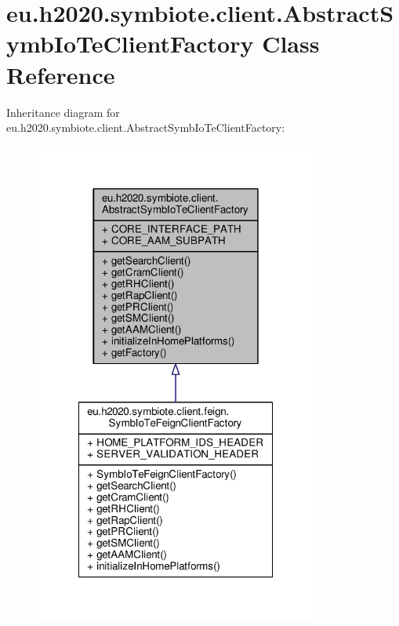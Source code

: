 \hypertarget{classeu_1_1h2020_1_1symbiote_1_1client_1_1AbstractSymbIoTeClientFactory}{}\section{eu.\+h2020.\+symbiote.\+client.\+Abstract\+Symb\+Io\+Te\+Client\+Factory Class Reference}
\label{classeu_1_1h2020_1_1symbiote_1_1client_1_1AbstractSymbIoTeClientFactory}


Inheritance diagram for eu.\+h2020.\+symbiote.\+client.\+Abstract\+Symb\+Io\+Te\+Client\+Factory\+:\nopagebreak
\begin{figure}[H]
\begin{center}
\leavevmode
\includegraphics[width=264pt]{classeu_1_1h2020_1_1symbiote_1_1client_1_1AbstractSymbIoTeClientFactory__inherit__graph}
\end{center}
\end{figure}


